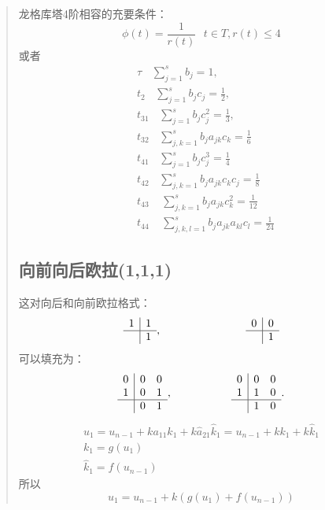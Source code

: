 \documentclass{article}
\begin{document}
\begin{CJK}{UTF8}{gkai}
\begin{quotation}
龙格库塔4阶相容的充要条件：
\begin{equation*}
\phi(t)=\frac{1}{r(t)} ~~~t\in T,r(t)\le 4
\end{equation*}
或者
\begin{align*}
&\tau~~~~\sum_{j=1}^{s}b_{j}=1,\\
&t_{2}~~~~\sum_{j=1}^{s}b_{j}c_{j}=\frac{1}{2},\\
&t_{31}~~~~\sum_{j=1}^{s}b_{j}c_{j}^2=\frac{1}{3},\\
&t_{32}~~~~\sum_{j,k=1}^{s}b_{j}a_{jk}c_{k}=\frac{1}{6}\\
&t_{41}~~~~\sum_{j=1}^{s}b_{j}c_{j}^3=\frac{1}{4}\\
&t_{42}~~~~\sum_{j,k=1}^{s}b_{j}a_{jk}c_{k}c_{j}=\frac{1}{8}\\
&t_{43}~~~~~\sum_{j,k=1}^{s}b_{j}a_{jk}c_{k}^2=\frac{1}{12}\\
&t_{44}~~~~~\sum_{j,k,l=1}^{s}b_{j}a_{jk}a_{kl}c_{l}=\frac{1}{24}
\end{align*}
\subsection{向前向后欧拉(1,1,1)}

这对向后和向前欧拉格式：
\[
\begin{array}{r|r}
1 & 1 \\
\hline
& 1
\end{array},~~~~~~~~~~~~~~~~~~~~~~~
\begin{array}{r|r}
0 & 0 \\
\hline
& 1 
\end{array}
\]
可以填充为：
\[
\begin{array}{r|rr}
0 & 0 & 0 \\
1 & 0 & 1 \\
\hline
& 0 & 1
\end{array},~~~~~~~~~~~~~~~~
\begin{array}{r|rr}
0 & 0 & 0\\
1 & 1 & 0\\
\hline
& 1 & 0
\end{array}.
\]
\begin{gather*}
u_{1}=u_{n-1}+ka_{11}k_{1}+k\hat{a}_{21}\hat{k}_{1}=u_{n-1}+k k_{1}+k \hat{k}_{1}\\
k_{1}=g(u_{1})\\
\hat{k}_{1}=f(u_{n-1})
\end{gather*}
所以
\begin{equation*}
u_{1}=u_{n-1}+k(g(u_{1})+f(u_{n-1}))
\end{equation*}


\end{quotation}
\end{CJK}
\end{document}
